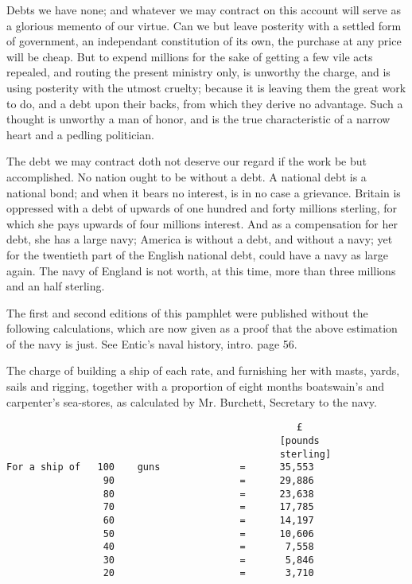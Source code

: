 \documentclass[12pt,oneside]{memoir}
\begin{document}
Debts we have none; and whatever we may contract on this account
will serve as a glorious memento of our virtue. Can we but leave
posterity with a settled form of government, an independant
constitution of its own, the purchase at any price will be cheap.
But to expend millions for the sake of getting a few vile acts
repealed, and routing the present ministry only, is unworthy the
charge, and is using posterity with the utmost cruelty; because it
is leaving them the great work to do, and a debt upon their backs,
from which they derive no advantage. Such a thought is unworthy a
man of honor, and is the true characteristic of a narrow heart and a
pedling politician.

The debt we may contract doth not deserve our regard if the work be
but accomplished. No nation ought to be without a debt. A national
debt is a national bond; and when it bears no interest, is in no
case a grievance. Britain is oppressed with a debt of upwards of one
hundred and forty millions sterling, for which she pays upwards of
four millions interest. And as a compensation for her debt, she has
a large navy; America is without a debt, and without a navy; yet for
the twentieth part of the English national debt, could have a navy
as large again. The navy of England is not worth, at this time, more
than three millions and an half sterling.

The first and second editions of this pamphlet were published
without the following calculations, which are now given as a proof
that the above estimation of the navy is just. See Entic's naval
history, intro. page 56.

The charge of building a ship of each rate, and furnishing her with
masts, yards, sails and rigging, together with a proportion of eight
months boatswain's and carpenter's sea-stores, as calculated by Mr.
Burchett, Secretary to the navy.

\begin{verbatim}
                                                   £
                                                [pounds
                                                sterling]
For a ship of   100    guns              =      35,553
                 90                      =      29,886
                 80                      =      23,638
                 70                      =      17,785
                 60                      =      14,197
                 50                      =      10,606
                 40                      =       7,558
                 30                      =       5,846
                 20                      =       3,710
\end{verbatim}
\end{document}
